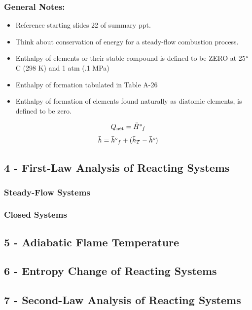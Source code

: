 \documentclass[10pt,landscape]{article}
\begin{document}
\begin{multicols}{3}
\subsubsection{General Notes:}
\begin{itemize}
    \item Reference starting slides 22 of summary ppt.
    \item Think about conservation of energy for a steady-flow combustion process.
    \item Enthalpy of elements or their stable compound is defined to be ZERO at 25$\degree$C (298 K) and 1 atm (.1 MPa)
    \item Enthalpy of formation tabulated in Table A-26
    \item Enthalpy of formation of elements found naturally as diatomic elements, is defined to be zero.
\end{itemize}
\begin{equation}
    Q_\text{net}=\bar{H}\degree_f
\end{equation}
\begin{equation}
    \bar{h}=\bar{h}\degree_f+(\bar{h}_T-\bar{h}\degree)
\end{equation}
\subsection{4 - First-Law Analysis of Reacting Systems}
\subsubsection{Steady-Flow Systems}
\subsubsection{Closed Systems}
\subsection{5 - Adiabatic Flame Temperature}
\subsection{6 - Entropy Change of Reacting Systems}
\subsection{7 - Second-Law Analysis of Reacting Systems}

%
%

\end{multicols}
\end{document}
